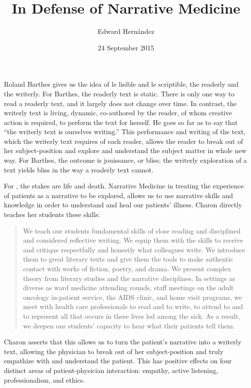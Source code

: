 \documentclass[doc,12pt]{apa6}
\begin{document}
\title{In Defense of Narrative Medicine}
\author{Edward Hern\'{a}ndez}
\date{24 September 2015}
\maketitle

Roland Barthes gives us the idea of le lisible and le scriptible, the readerly
and the writerly. For Barthes, the readerly text is static.  There is only one
way to read a readerly text, and it largely does not change over time. In
contrast, the writerly text is living, dynamic, co-authored by the reader, of
whom creative action is required, to perform the text for herself. He goes so
far as to say that ``the writerly text is ourselves writing.'' This performance
and writing of the text, which the writerly text requires of each reader,
allows the reader to break out of her subject-position and explore and
understand the subject matter in whole new way. For Barthes, the outcome is
jouissance, or bliss; the writerly exploration of a text yields bliss in the
way a readerly text cannot.

For , the stakes are life and death. Narrative Medicine in treating the
experience of patients as a narrative to be explored, allows us to use
narrative skills and knowledge in order to understand and heal our patients'
illness. Charon directly teaches her students these skills:

\begin{quote}
	We teach our students fundamental skills of close reading and disciplined
	and considered reflective writing. We equip them with the skills to receive
	and critique respectfully and honestly what colleagues write. We introduce
	them to great literary texts and give them the tools to make authentic
	contact with works of fiction, poetry, and drama. We present complex theory
	from literary studies and the narrative disciplines. In settings as diverse
	as ward medicine attending rounds, staff meetings on the adult oncology
	in-patient service, the AIDS clinic, and home visit programs, we meet with
	health care professionals to read and to write, to attend to and to
	represent all that occurs in these lives led among the sick. As a result,
	we deepen our students' capacity to hear what their patients tell them.
	\cite[Preface]{Charon06}
\end{quote}

Charon asserts that this allows us to turn the patient's narrative into
a writerly text, allowing the physician to break out of her
subject-position and truly empathize with and understand the patient.
This has positive effects on four distinct areas of patient-physician
interaction: empathy, active listening, professionalism, and ethics.
\end{document}
